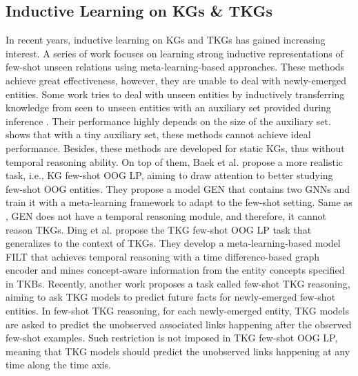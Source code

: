 \documentclass[runningheads]{llncs}
\begin{document}
\subsection{Inductive Learning on KGs \& TKGs} 
In recent years, inductive learning on KGs and TKGs has gained increasing interest. A series of work \cite{DBLP:conf/emnlp/XiongYCGW18,DBLP:conf/emnlp/ChenZZCC19,DBLP:conf/emnlp/ShengGCYWLX20,mirtaheri2021one,DBLP:journals/corr/abs-2205-10621} focuses on learning strong inductive representations of few-shot unseen relations using meta-learning-based approaches. These methods achieve great effectiveness, however, they are unable to deal with newly-emerged entities. Some work tries to deal with unseen entities by inductively transferring knowledge from seen to unseen entities with an auxiliary set provided during inference \cite{DBLP:conf/ijcai/HamaguchiOSM17,DBLP:conf/aaai/WangHLP19,DBLP:conf/cikm/HeWZTR20}. Their performance highly depends on the size of the auxiliary set. \cite{ding2022few} shows that with a tiny auxiliary set, these methods cannot achieve ideal performance. Besides, these methods are developed for static KGs, thus without temporal reasoning ability. On top of them, Baek et al. \cite{DBLP:conf/nips/BaekLH20} propose a more realistic task, i.e., KG few-shot OOG LP, aiming to draw attention to better studying few-shot OOG entities. They propose a model GEN that contains two GNNs
and train it with a meta-learning framework to adapt to the few-shot setting. Same as \cite{DBLP:conf/ijcai/HamaguchiOSM17,DBLP:conf/aaai/WangHLP19,DBLP:conf/cikm/HeWZTR20}, GEN does not have a temporal reasoning module, and therefore, it cannot reason TKGs. Ding et al. \cite{ding2022few} propose the TKG few-shot OOG LP task that generalizes \cite{DBLP:conf/nips/BaekLH20} to the context of TKGs. They develop a meta-learning-based model FILT that achieves temporal reasoning with a time difference-based graph encoder and mines concept-aware information from the entity concepts specified in TKBs.
Recently, another work \cite{DBLP:conf/nips/0004LSLLYA22} 
proposes a task called few-shot TKG reasoning, aiming to ask TKG models to predict future facts for newly-emerged few-shot entities. 
In few-shot TKG reasoning, for each newly-emerged entity, TKG models are asked to predict the unobserved associated links happening after the observed few-shot examples. Such restriction is not imposed in TKG few-shot OOG LP, meaning that TKG models should predict the unobserved links happening at any time along the time axis.
\end{document}
